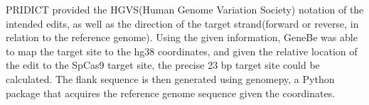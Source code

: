 PRIDICT provided the HGVS(Human Genome Variation Society) notation of the intended edits, as well as the direction of the target strand(forward or reverse, in relation to the reference genome). Using the given information, GeneBe was able to map the target site to the hg38 coordinates, and given the relative location of the edit to the SpCas9 target site, the precise 23 bp target site could be calculated\cite{stawinskiGenebenetImplementationValidation2024}. The flank sequence is then generated using genomepy, a Python package that acquires the reference genome sequence given the coordinates.
